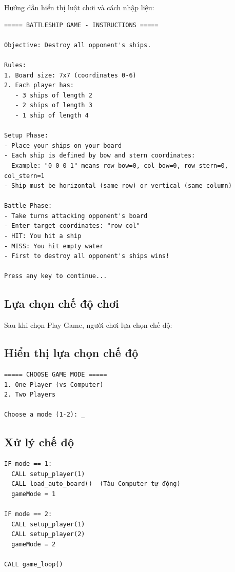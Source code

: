 Hướng dẫn hiển thị luật chơi và cách nhập liệu:

\begin{verbatim}
===== BATTLESHIP GAME - INSTRUCTIONS =====

Objective: Destroy all opponent's ships.

Rules:
1. Board size: 7x7 (coordinates 0-6)
2. Each player has:
   - 3 ships of length 2
   - 2 ships of length 3
   - 1 ship of length 4

Setup Phase:
- Place your ships on your board
- Each ship is defined by bow and stern coordinates:
  Example: "0 0 0 1" means row_bow=0, col_bow=0, row_stern=0, col_stern=1
- Ship must be horizontal (same row) or vertical (same column)

Battle Phase:
- Take turns attacking opponent's board
- Enter target coordinates: "row col"
- HIT: You hit a ship
- MISS: You hit empty water
- First to destroy all opponent's ships wins!

Press any key to continue...
\end{verbatim}

\subsection{Lựa chọn chế độ chơi}

Sau khi chọn Play Game, người chơi lựa chọn chế độ:

\subsection{Hiển thị lựa chọn chế độ}

\begin{verbatim}
===== CHOOSE GAME MODE =====
1. One Player (vs Computer)
2. Two Players

Choose a mode (1-2): _
\end{verbatim}

\subsection{Xử lý chế độ}

\begin{verbatim}
IF mode == 1:
  CALL setup_player(1)
  CALL load_auto_board()  (Tàu Computer tự động)
  gameMode = 1

IF mode == 2:
  CALL setup_player(1)
  CALL setup_player(2)
  gameMode = 2

CALL game_loop()
\end{verbatim}

